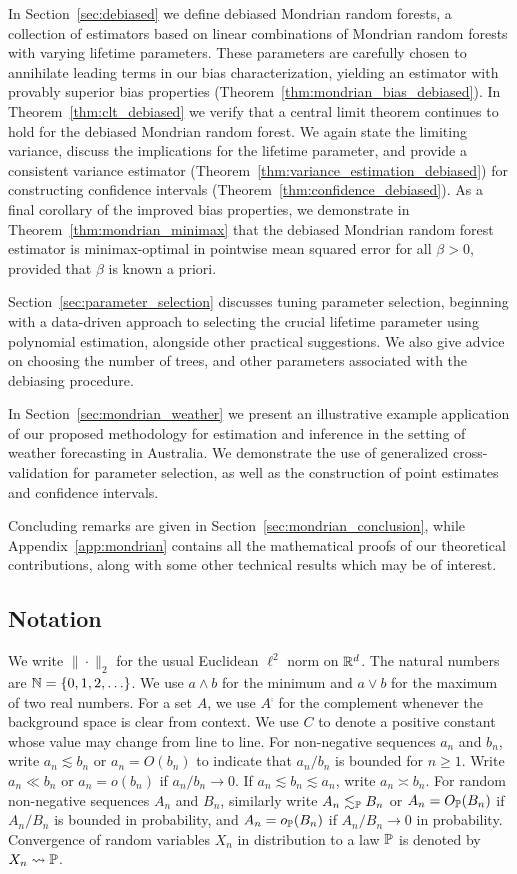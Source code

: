 In Section~\ref{sec:debiased} we define debiased Mondrian random forests, a
collection of estimators based on linear combinations of Mondrian random
forests with varying lifetime parameters. These parameters are carefully chosen
to annihilate leading terms in our bias characterization, yielding an estimator
with provably superior bias properties
(Theorem~\ref{thm:mondrian_bias_debiased}). In Theorem~\ref{thm:clt_debiased}
we verify that a central limit theorem continues to hold for the debiased
Mondrian random forest. We again state the limiting variance, discuss the
implications for the lifetime parameter, and provide a consistent variance
estimator (Theorem~\ref{thm:variance_estimation_debiased}) for constructing
confidence intervals (Theorem~\ref{thm:confidence_debiased}). As a final
corollary of the improved bias properties, we demonstrate in
Theorem~\ref{thm:mondrian_minimax} that the debiased Mondrian random forest
estimator is minimax-optimal in pointwise mean squared error for all
$\beta > 0$, provided that $\beta$ is known a priori.

Section~\ref{sec:parameter_selection} discusses tuning parameter selection,
beginning with a data-driven approach to selecting the crucial lifetime
parameter using polynomial estimation, alongside other practical suggestions.
We also give advice on choosing the number of trees, and other parameters
associated with the debiasing procedure.

In Section~\ref{sec:mondrian_weather} we present an illustrative example
application of our proposed methodology for estimation and inference in the
setting of weather forecasting in Australia. We demonstrate the use of
generalized cross-validation for parameter selection, as well as the
construction of point estimates and confidence intervals.

Concluding remarks are given in Section~\ref{sec:mondrian_conclusion}, while
Appendix~\ref{app:mondrian} contains all the mathematical proofs of our
theoretical contributions, along with some other technical results which
may be of interest.

\subsection{Notation}

We write $\|\cdot\|_2$ for the usual Euclidean $\ell^2$ norm on $\R^d$. The
natural numbers are $\N = \{0, 1, 2, \ldots \}$. We use $a \wedge b$ for the
minimum and $a \vee b$ for the maximum of two real numbers. For a set $A$, we
use $A^{\comp}$ for the complement whenever the background space is clear from
context. We use $C$ to denote a positive constant whose value may change from
line to line. For non-negative sequences $a_n$ and $b_n$, write
$a_n \lesssim b_n$ or $a_n = O(b_n)$ to indicate that $a_n / b_n$ is bounded
for $n\geq 1$. Write $a_n \ll b_n$ or $a_n = o(b_n)$ if $a_n / b_n \to 0$. If
$a_n \lesssim b_n \lesssim a_n$, write $a_n \asymp b_n$. For random
non-negative sequences $A_n$ and $B_n$, similarly write $A_n \lesssim_\P B_n$
or $A_n = O_\P(B_n)$ if $A_n / B_n$ is bounded in probability,
and $A_n = o_\P(B_n)$ if $A_n / B_n \to 0$ in probability. Convergence of
random variables $X_n$ in distribution to a law $\P$ is denoted by
$X_n \rightsquigarrow \P$.

